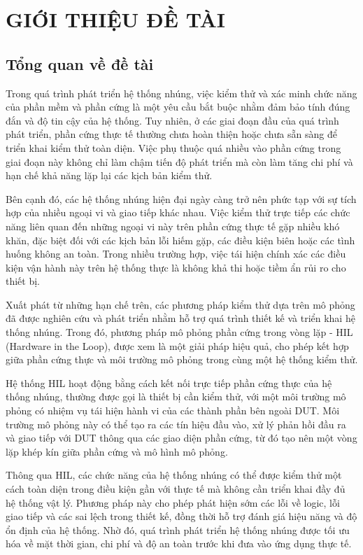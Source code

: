 \chapter{GIỚI THIỆU ĐỀ TÀI}
\section{Tổng quan về đề tài}
Trong quá trình phát triển hệ thống nhúng, việc kiểm thử và xác minh chức năng của phần mềm và phần cứng là một yêu cầu bắt buộc nhằm đảm bảo tính đúng đắn và độ tin cậy của hệ thống. Tuy nhiên, ở các giai đoạn đầu của quá trình phát triển, phần cứng thực tế thường chưa hoàn thiện hoặc chưa sẵn sàng để triển khai kiểm thử toàn diện. Việc phụ thuộc quá nhiều vào phần cứng trong giai đoạn này không chỉ làm chậm tiến độ phát triển mà còn làm tăng chi phí và hạn chế khả năng lặp lại các kịch bản kiểm thử.

Bên cạnh đó, các hệ thống nhúng hiện đại ngày càng trở nên phức tạp với sự tích hợp của nhiều ngoại vi và giao tiếp khác nhau. Việc kiểm thử trực tiếp các chức năng liên quan đến những ngoại vi này trên phần cứng thực tế gặp nhiều khó khăn, đặc biệt đối với các kịch bản lỗi hiếm gặp, các điều kiện biên hoặc các tình huống không an toàn. Trong nhiều trường hợp, việc tái hiện chính xác các điều kiện vận hành này trên hệ thống thực là không khả thi hoặc tiềm ẩn rủi ro cho thiết bị.

Xuất phát từ những hạn chế trên, các phương pháp kiểm thử dựa trên mô phỏng đã được nghiên cứu và phát triển nhằm hỗ trợ quá trình thiết kế và triển khai hệ thống nhúng. Trong đó, phương pháp mô phỏng phần cứng trong vòng lặp - HIL (Hardware in the Loop), được xem là một giải pháp hiệu quả, cho phép kết hợp giữa phần cứng thực và môi trường mô phỏng trong cùng một hệ thống kiểm thử.

Hệ thống HIL hoạt động bằng cách kết nối trực tiếp phần cứng thực của hệ thống nhúng, thường được gọi là thiết bị cần kiểm thử, với một môi trường mô phỏng có nhiệm vụ tái hiện hành vi của các thành phần bên ngoài DUT. Môi trường mô phỏng này có thể tạo ra các tín hiệu đầu vào, xử lý phản hồi đầu ra và giao tiếp với DUT thông qua các giao diện phần cứng, từ đó tạo nên một vòng lặp khép kín giữa phần cứng và mô hình mô phỏng.

Thông qua HIL, các chức năng của hệ thống nhúng có thể được kiểm thử một cách toàn diện trong điều kiện gần với thực tế mà không cần triển khai đầy đủ hệ thống vật lý. Phương pháp này cho phép phát hiện sớm các lỗi về logic, lỗi giao tiếp và các sai lệch trong thiết kế, đồng thời hỗ trợ đánh giá hiệu năng và độ ổn định của hệ thống. Nhờ đó, quá trình phát triển hệ thống nhúng được tối ưu hóa về mặt thời gian, chi phí và độ an toàn trước khi đưa vào ứng dụng thực tế.

